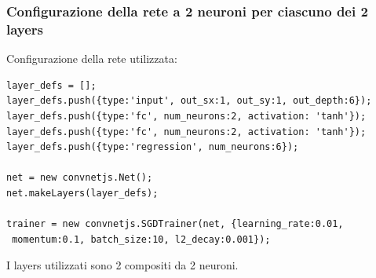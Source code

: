 \subsubsection{Configurazione della rete a 2 neuroni per ciascuno dei 2 layers}
\label{Configurazione della rete a 2 neuroni per ciascuno dei 2 layers}
Configurazione della rete utilizzata:\\
\begin{verbatim}layer_defs = [];
layer_defs.push({type:'input', out_sx:1, out_sy:1, out_depth:6});
layer_defs.push({type:'fc', num_neurons:2, activation: 'tanh'});
layer_defs.push({type:'fc', num_neurons:2, activation: 'tanh'});
layer_defs.push({type:'regression', num_neurons:6});

net = new convnetjs.Net();
net.makeLayers(layer_defs);

trainer = new convnetjs.SGDTrainer(net, {learning_rate:0.01,
 momentum:0.1, batch_size:10, l2_decay:0.001});
\end{verbatim}
\noindent
I layers utilizzati sono 2 compositi da 2 neuroni.

